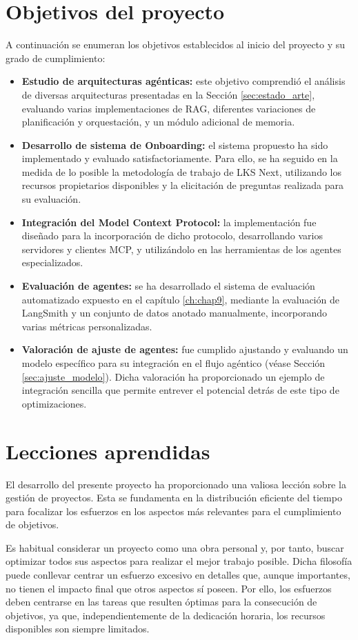 \section{Objetivos del proyecto}
A continuación se enumeran los objetivos establecidos al inicio del proyecto y su grado de cumplimiento:
\begin{itemize}
\item\textbf{Estudio de arquitecturas agénticas: }este objetivo comprendió el análisis de diversas arquitecturas presentadas en la Sección \ref{sec:estado_arte}, evaluando varias implementaciones de RAG, diferentes variaciones de planificación y orquestación, y un módulo adicional de memoria.
\item\textbf{Desarrollo de sistema de Onboarding: }el sistema propuesto ha sido implementado y evaluado satisfactoriamente. Para ello, se ha seguido en la medida de lo posible la metodología de trabajo de LKS Next, utilizando los recursos propietarios disponibles y la elicitación de preguntas realizada para su evaluación.
\item\textbf{Integración del Model Context Protocol: }la implementación fue diseñado para la incorporación de dicho protocolo, desarrollando varios servidores y clientes MCP, y utilizándolo en las herramientas de los agentes especializados.
\item\textbf{Evaluación de agentes: }se ha desarrollado el sistema de evaluación automatizado expuesto en el capítulo \ref{ch:chap9}, mediante la evaluación de LangSmith y un conjunto de datos anotado manualmente, incorporando varias métricas personalizadas.
\item\textbf{Valoración de ajuste de agentes: }fue cumplido ajustando y evaluando un modelo específico para su integración en el flujo agéntico (véase Sección \ref{sec:ajuste_modelo}). Dicha valoración ha proporcionado un ejemplo de integración sencilla que permite entrever el potencial detrás de este tipo de optimizaciones.
\end{itemize}

\section{Lecciones aprendidas}
El desarrollo del presente proyecto ha proporcionado una valiosa lección sobre la gestión de proyectos. Esta se fundamenta en la distribución eficiente del tiempo para focalizar los esfuerzos en los aspectos más relevantes para el cumplimiento de objetivos.

Es habitual considerar un proyecto como una obra personal y, por tanto, buscar optimizar todos sus aspectos para realizar el mejor trabajo posible. Dicha filosofía puede conllevar centrar un esfuerzo excesivo en detalles que, aunque importantes, no tienen el impacto final que otros aspectos sí poseen. Por ello, los esfuerzos deben centrarse en las tareas que resulten óptimas para la consecución de objetivos, ya que, independientemente de la dedicación horaria, los recursos disponibles son siempre limitados.

